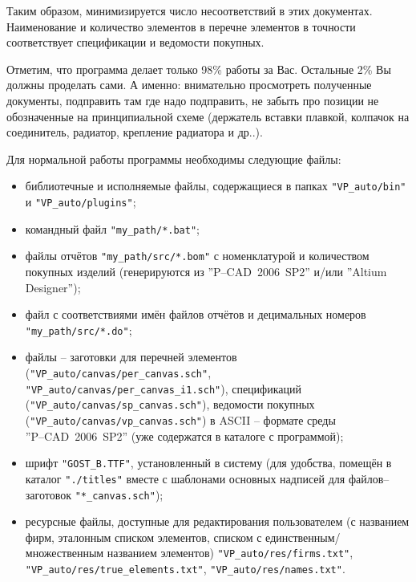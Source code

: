 Таким образом, минимизируется число несоответствий в этих документах. Наименование и количество элементов в перечне элементов в точности соответствует спецификации и ведомости покупных.

Отметим, что программа делает только 98\% работы за Вас. Остальные 2\% Вы должны проделать сами. А именно: внимательно просмотреть полученные документы, подправить там где надо подправить, не забыть про позиции не обозначенные на принципиальной схеме (держатель вставки плавкой, колпачок на соединитель, радиатор, крепление радиатора и др..).

Для нормальной работы программы необходимы следующие файлы:
\begin{itemize}
  \item библиотечные и исполняемые файлы, содержащиеся в папках \verb|"VP_auto/bin"| и \verb|"VP_auto/plugins"|;
  \item командный файл \verb|"my_path/*.bat"|;
  \item файлы отчётов \verb|"my_path/src/*.bom"| с номенклатурой и количеством покупных изделий (генерируются из ''P--CAD~2006~SP2'' и/или ''Altium Designer'');  
  \item файл с соответствиями имён файлов отчётов и децимальных номеров \\\verb|"my_path/src/*.do"|;
  \item файлы -- заготовки для перечней элементов (\verb|"VP_auto/canvas/per_canvas.sch"|, \verb|"VP_auto/canvas/per_canvas_i1.sch"|), спецификаций (\verb|"VP_auto/canvas/sp_canvas.sch"|), ведомости покупных (\verb|"VP_auto/canvas/vp_canvas.sch"|) в ASCII -- формате среды \\''P--CAD~2006~SP2'' (уже содержатся в каталоге с программой);
  \item шрифт \verb|"GOST_B.TTF"|, установленный в систему (для удобства, помещён в каталог \verb|"./titles"| вместе с шаблонами основных надписей для файлов--заготовок \verb|"*_canvas.sch"|);
  \item ресурсные файлы, доступные для редактирования пользователем (с названием фирм, эталонным списком элементов, списком с единственным/множественным названием элементов) \verb|"VP_auto/res/firms.txt"|, \verb|"VP_auto/res/true_elements.txt"|,
  \verb|"VP_auto/res/names.txt"|.
\end{itemize}







